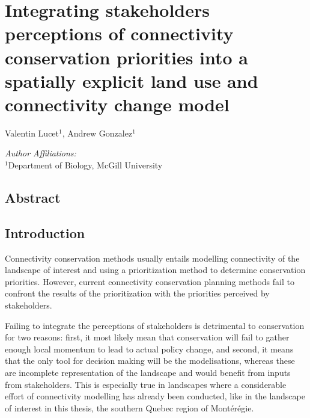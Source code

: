 \chapter{Integrating stakeholders perceptions of connectivity conservation priorities into a spatially explicit land use and connectivity change model}
\begin{center}
{Valentin Lucet$^{1}$, Andrew Gonzalez$^{1}$}\\
\end{center}
\textit{Author Affiliations:}\\
\normalsize{$^{1}$Department of Biology, McGill University}\\

\section{Abstract}

\section{Introduction}
%

Connectivity conservation methods usually entails modelling connectivity of the landscape of interest and using a prioritization method to determine conservation priorities. However, current connectivity conservation planning methods fail to confront the results of the prioritization with the priorities perceived by stakeholders.

Failing to integrate the perceptions of stakeholders is detrimental to conservation for two reasons: first, it most likely mean that conservation will fail to gather enough local momentum to lead to actual policy change, and second, it means that the only tool for decision making will be the modelisations, whereas these are incomplete representation of the landscape and would benefit from inputs from stakeholders. This is especially true in landscapes where a considerable effort of connectivity modelling has already been conducted, like in the landscape of interest in this thesis, the southern Quebec region of Montérégie.

